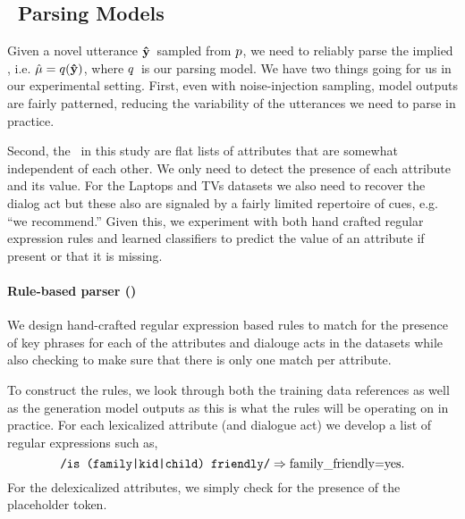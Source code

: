 \subsection{\MeaningRepresentation~Parsing Models}

Given a novel utterance $\boldsymbol{\hat{\mathbf{y}}}$~sampled from $p$, we need to 
reliably parse the implied \meaningrepresentation, i.e. 
$\hat{\mu} = q(\boldsymbol{\hat{\mathbf{y}}})$, 
where $q$~is our parsing model. We have two things going for us in 
our experimental setting. First, even with noise-injection sampling,
model outputs are fairly patterned, reducing the variability of the utterances
we need to parse in practice. 

Second, the \meaningrepresentation~in this study are
flat lists of attributes that are somewhat independent of each other.
We only need to detect the presence of each attribute and its value.
For the Laptops and TVs datasets we also need to recover the dialog
act but these also are signaled by a fairly limited repertoire 
of cues, e.g. ``we recommend.'' %
Given this, we experiment with both hand crafted regular expression 
rules and learned classifiers to predict the value of
an attribute if present or that it is missing. 


\paragraph{Rule-based parser ()} We design hand-crafted 
regular expression based rules to match for the presence of key phrases 
for each of the attributes and dialouge acts in the datasets while also checking to
make sure that there is only one match per attribute.

To construct the rules, we look through both the training data references as 
well as the generation model outputs as this is what the rules will
be operating on in practice. For each lexicalized attribute (and dialogue act) we 
develop a list of regular expressions %
such as,\[
\texttt{/is (family|kid|child) friendly/} \Rightarrow \textrm{family\_friendly=yes}.\]
For the delexicalized attributes, we simply check for the presence 
of the placeholder token. 


